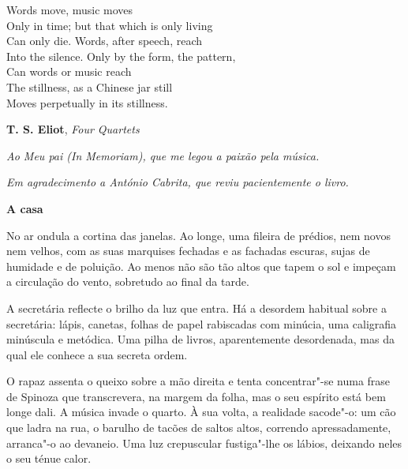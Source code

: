 \movetooddpage
\thispagestyle{empty}
\begin{vplace}[0.8]
\begin{flushright}
Words move, music moves\\
Only in time; but that which is only living\\
Can only die. Words, after speech, reach\\
Into the silence. Only by the form, the pattern,\\
Can words or music reach\\
The stillness, as a Chinese jar still\\
Moves perpetually in its stillness.

\medskip

\textbf{T. S. Eliot}, \emph{Four Quartets}
\end{flushright}
\end{vplace}
\pagebreak

\thispagestyle{empty}
\begin{flushright}
\begin{vplace}[0.8]
\emph{Ao Meu pai (\emph{In Memoriam}), que me legou a paixão pela música.}

\medskip

\emph{Em agradecimento a António Cabrita, que reviu pacientemente o livro.}
\end{vplace}
\end{flushright}

\vspace*{1.8cm}
\noindent{}\textbf{A casa}

\bigskip

No ar ondula a cortina das janelas. Ao longe, uma fileira de prédios,
nem novos nem velhos, com as suas marquises fechadas e as fachadas
escuras, sujas de humidade e de poluição. Ao menos não são tão altos que
tapem o sol e impeçam a circulação do vento, sobretudo ao final da
tarde.

A secretária reflecte o brilho da luz que entra. Há a desordem habitual
sobre a secretária: lápis, canetas, folhas de papel rabiscadas com
minúcia, uma caligrafia minúscula e metódica. Uma pilha de livros,
aparentemente desordenada, mas da qual ele conhece a sua secreta ordem.

O rapaz assenta o queixo sobre a mão direita e tenta concentrar"-se numa
frase de Spinoza que transcrevera, na margem da folha, mas o seu
espírito está bem longe dali. A música invade o quarto. À sua volta, a
realidade sacode"-o: um cão que ladra na rua, o barulho de tacões de
saltos altos, correndo apressadamente, arranca"-o ao devaneio. Uma luz
crepuscular fustiga"-lhe os lábios, deixando neles o seu ténue calor.

